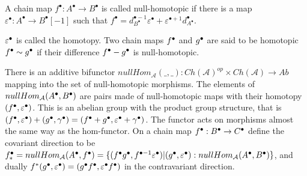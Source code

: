     \begin{definition}
        A chain map $f^{\bullet}:A^{\bullet}\rightarrow B^{\bullet}$ is called null-homotopic if there is a map $\varepsilon^{\bullet}:A^{\bullet}\rightarrow B^{\bullet}[-1]$ such that $f^{\bullet} = d_{B^{\bullet}}^{\bullet - 1}\varepsilon^{\bullet} + \varepsilon^{\bullet + 1}d_{A^{\bullet}}^{\bullet}$.
        \begin{center}
        \end{center}
        $\varepsilon^{\bullet}$ is called the homotopy. Two chain maps $f^{\bullet}$ and $g^{\bullet}$ are said to be homotopic $f^{\bullet}\sim g^{\bullet}$ if their difference $f^{\bullet}-g^{\bullet}$ is null-homotopic.
    \end{definition}

    \begin{prop}
        There is an additive bifunctor $nullHom_{\mathcal{A}}(\_,\_):Ch(\mathcal{A})^{op}\times Ch(\mathcal{A})\rightarrow Ab$ mapping into the set of null-homotopic morphisms. The elements of $nullHom_{\mathcal{A}}(A^{\bullet},B^{\bullet})$ are pairs made of null-homotopic maps with their homotopy $(f^{\bullet},\varepsilon^{\bullet})$. This is an abelian group with the product group structure, that is $(f^{\bullet},\varepsilon^{\bullet}) + (g^{\bullet},\gamma^{\bullet}) = (f^{\bullet}+g^{\bullet},\varepsilon^{\bullet}+\gamma^{\bullet})$. The functor acts on morphisms almost the same way as the hom-functor. On a chain map $f^{\bullet}:B^{\bullet}\rightarrow C^{\bullet}$ define the covariant direction to be $f^{\bullet}_{*} = nullHom_{\mathcal{A}}(A^{\bullet},f^{\bullet}) = \{(f^{\bullet}g^{\bullet},f^{\bullet-1}\varepsilon^{\bullet}) | (g^{\bullet},\varepsilon^{\bullet}) : nullHom_{\mathcal{A}}(A^{\bullet},B^{\bullet}) \}$, and dually $f^{*}(g^{\bullet},\varepsilon^{\bullet}) = (g^{\bullet}f^{\bullet}, \varepsilon^{\bullet}f^{\bullet})$ in the contravariant direction.
    \end{prop}

